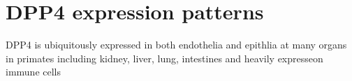\section{DPP4 expression patterns}
DPP4 is ubiquitously expressed in both endothelia and epithlia at many organs in primates including kidney, liver, lung, intestines and heavily expresseon immune cells